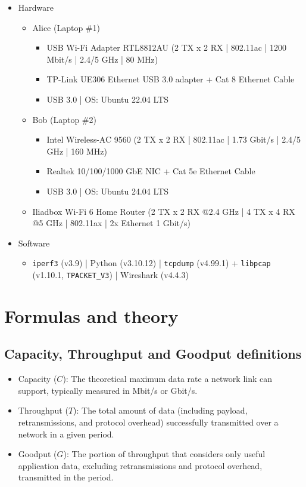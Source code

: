 \begin{itemize}
    \item Hardware
    \begin{itemize}
        \item Alice (Laptop \#1)  
        \begin{itemize}
            \item USB Wi-Fi Adapter RTL8812AU \cite{rtl8812au} (2 TX x 2 RX | 802.11ac | 1200 Mbit/s | 2.4/5 GHz | 80 MHz)
            \item TP-Link UE306 Ethernet USB 3.0 adapter \cite{tplinkue306} + Cat 8 Ethernet Cable
            \item USB 3.0 | OS: Ubuntu 22.04 LTS
        \end{itemize}
        \item Bob (Laptop \#2)  
        \begin{itemize}
            \item Intel Wireless-AC 9560 \cite{intelac9560} (2 TX x 2 RX | 802.11ac | 1.73 Gbit/s | 2.4/5 GHz | 160 MHz)
            \item Realtek 10/100/1000 GbE NIC + Cat 5e Ethernet Cable
            \item USB 3.0 | OS: Ubuntu 24.04 LTS
        \end{itemize}
        \item Iliadbox Wi-Fi 6 Home Router \cite{iliadbox} (2 TX x 2 RX @2.4 GHz | 4 TX x 4 RX @5 GHz | 802.11ax | 2x Ethernet 1 Gbit/s)
    \end{itemize}
    \item Software  
    \begin{itemize}
        \item \texttt{iperf3} (v3.9) | Python (v3.10.12) | \texttt{tcpdump} (v4.99.1) + \texttt{libpcap} (v1.10.1, \texttt{TPACKET\_V3}) | Wireshark (v4.4.3)
    \end{itemize}
\end{itemize}
\section{Formulas and theory}
\subsection{Capacity, Throughput and Goodput definitions}
    \begin{itemize}
        \item Capacity ($C$): The theoretical maximum data rate a network link can support, typically measured in Mbit/s or Gbit/s.
        \item Throughput ($T$): The total amount of data (including payload, retransmissions, and protocol overhead) successfully transmitted over a network in a given period. 
        \item Goodput ($G$): The portion of throughput that considers only useful application data, excluding retransmissions and protocol overhead, transmitted in the period.
    \end{itemize}
    
